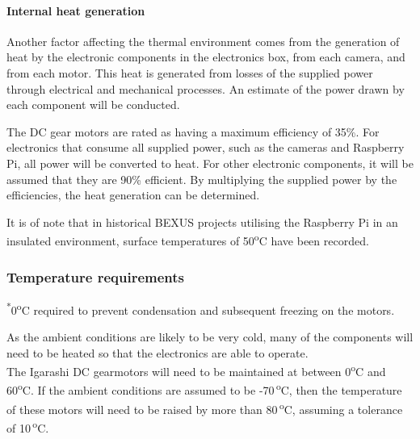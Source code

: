 \paragraph{Internal heat generation}
Another factor affecting the thermal environment comes from the generation of heat by the electronic components in the electronics box, from each camera, and from each motor. This heat is generated from losses of the supplied power through electrical and mechanical processes. An estimate of the power drawn by each component will be conducted.



The DC gear motors are rated as having a maximum efficiency of 35\%. For electronics that consume all supplied power, such as the cameras and Raspberry Pi, all power will be converted to heat. For other electronic components, it will be assumed that they are 90\% efficient. By multiplying the supplied power by the efficiencies, the heat generation can be determined.



It is of note that in historical BEXUS projects utilising the Raspberry Pi in an insulated environment, surface temperatures of 50\textsuperscript{o}C have been recorded. 

\subsubsection{Temperature requirements}



\textsuperscript{*}0\textsuperscript{o}C required to prevent condensation and subsequent freezing on the motors.\\

\newpage

As the ambient conditions are likely to be very cold, many of the components will need to be heated so that the electronics are able to operate.\\

The Igarashi DC gearmotors will need to be maintained at between 0\textsuperscript{o}C and 60\textsuperscript{o}C. If the ambient conditions are assumed to be -70\,\textsuperscript{o}C, then the temperature of these motors will need to be raised by more than 80\,\textsuperscript{o}C, assuming a tolerance of 10\,\textsuperscript{o}C.\\

